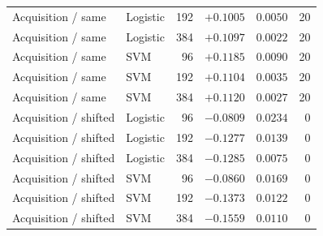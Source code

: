 \begin{longtable}{llrrrr}
Acquisition / same & Logistic & 192 & $+0.1005$ & $0.0050$ & 20\\
Acquisition / same & Logistic & 384 & $+0.1097$ & $0.0022$ & 20\\
Acquisition / same & SVM & 96 & $+0.1185$ & $0.0090$ & 20\\
Acquisition / same & SVM & 192 & $+0.1104$ & $0.0035$ & 20\\
Acquisition / same & SVM & 384 & $+0.1120$ & $0.0027$ & 20\\
Acquisition / shifted & Logistic & 96 & $-0.0809$ & $0.0234$ & 0\\
Acquisition / shifted & Logistic & 192 & $-0.1277$ & $0.0139$ & 0\\
Acquisition / shifted & Logistic & 384 & $-0.1285$ & $0.0075$ & 0\\
Acquisition / shifted & SVM & 96 & $-0.0860$ & $0.0169$ & 0\\
Acquisition / shifted & SVM & 192 & $-0.1373$ & $0.0122$ & 0\\
Acquisition / shifted & SVM & 384 & $-0.1559$ & $0.0110$ & 0\\
\end{longtable}
